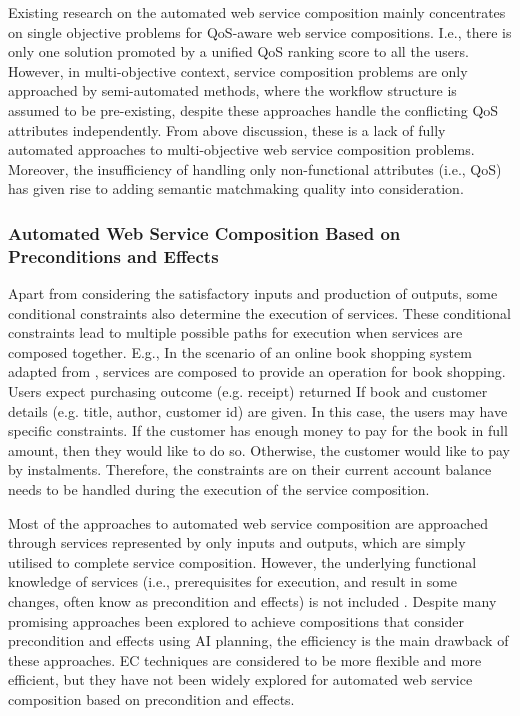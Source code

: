 Existing research on the automated web service composition mainly concentrates on single objective problems for QoS-aware web service compositions. I.e., there is only one solution promoted by a unified QoS ranking score to all the users. However, in multi-objective context, service composition problems  \cite{liu2005dynamic,wada2012e3,yin2014hybrid} are only approached by semi-automated methods, where the workflow structure is assumed to be pre-existing, despite these approaches handle the conflicting QoS attributes independently. From above discussion, these is a lack of fully automated approaches to multi-objective web service composition problems. Moreover, the insufficiency of handling only non-functional attributes (i.e., QoS) has given rise to adding semantic matchmaking quality into consideration.

\subsubsection{Automated Web Service Composition Based on Preconditions and Effects}
Apart from considering the satisfactory inputs and production of outputs, some conditional constraints also determine the execution of services.  These conditional constraints lead to multiple possible paths for execution when services are composed together. E.g., In the scenario of an online book shopping system adapted from \cite{wang2014automated}, services are composed to provide an operation for book shopping.  Users expect purchasing outcome (e.g. receipt) returned If book and customer details (e.g. title, author, customer id) are given. In this case, the users may have specific constraints. If the customer has enough money to pay for the book in full amount, then they would like to do so. Otherwise, the customer would like to pay by instalments. Therefore, the constraints are on their current account balance needs to be handled during the execution of the service composition.

Most of the approaches to automated web service composition are approached through services represented by only inputs and outputs, which are simply utilised to complete service composition. However, the underlying functional knowledge of services (i.e., prerequisites for execution, and result in some changes, often know as precondition and effects) is not included \cite{paliwal2012semantics}. Despite many promising approaches \cite{DBLP:journals/soca/BoustilMS14} been explored to achieve compositions that consider precondition and effects using AI planning, the efficiency is the main drawback of these approaches. EC techniques are considered to be more flexible and more efficient, but they have not been widely explored for automated web service composition based on precondition and effects.

